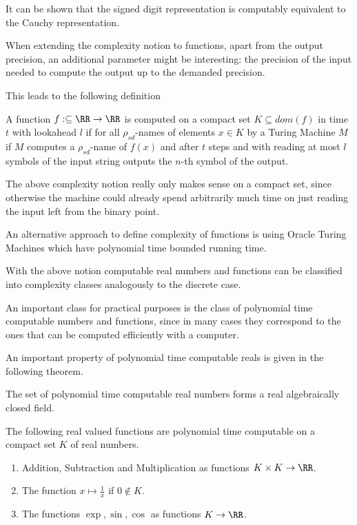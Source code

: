 		It can be shown that the signed digit representation is computably equivalent to the Cauchy representation.

		When extending the complexity notion to functions, apart from the output
    precision, an additional parameter might be interesting: the precision of the input
		needed to compute the output up to the demanded precision.

    This leads to the following definition
		\begin{definition}
      A function $f: \subseteq \RR \to \RR$ is computed on a compact set $K
      \subseteq dom(f)$ in time $t$ with lookahead $l$ if for all
      $\rho_{sd}$-names of elements $ x \in K$ by a Turing Machine $M$ if $M$
      computes a $\rho_{sd}$-name of $f(x)$ and after $t$ steps and with reading
      at most $l$ symbols of the input string outputs the $n$-th symbol of the
      output.   
    \end{definition} 
    The above complexity notion really only makes sense on a compact set, since
    otherwise the machine could already spend arbitrarily much time on just
    reading the input left from the binary point.
    
    An alternative approach to define complexity of functions is using Oracle
    Turing Machines which have polynomial time bounded running time. 

    With the above notion computable real numbers and functions can be
    classified into complexity classes analogously to the discrete case.

    An important class for practical purposes is the class of polynomial time
    computable numbers and functions, since in many cases they correspond to
    the ones that can be computed efficiently with a computer.
   
    An important property of polynomial time computable reals is given in the
    following theorem.
		\begin{theorem}
			The set of polynomial time computable real numbers forms a real algebraically closed field.
		\end{theorem}
		\begin{example}
     The following real valued functions are polynomial time computable on a compact set
     $K$ of real numbers.
     \begin{enumerate}
       \item Addition, Subtraction and Multiplication as functions $K \times K
         \to \RR$.
        \item The function $x \mapsto \frac{1}{x}$ if $0 \not \in K$. 
         \item The functions $\exp, \sin, \cos$ as functions $K \to \RR$.
     \end{enumerate}
		\end{example}
